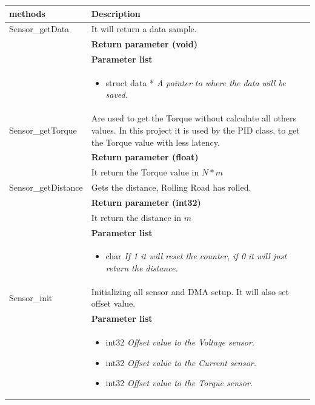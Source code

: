 \begin{table}[H]
	\centering
	\begin{tabular}{|p{5 cm}|p{10 cm}|}
		\hline
		\textbf{methods} & \textbf{Description} \\ \hline
		
		Sensor\_getData
		& It will return a data sample.
		\\ & \textbf{Return parameter (void)}
		\\ & \textbf{Parameter list}
		\\ & \begin{itemize}
			\item {\large struct data *}
			\subitem \textit{A pointer to where the data will be saved.}
		\end{itemize}
		\\ \hline
		
		Sensor\_getTorque
		& Are used to get the Torque without calculate all others values. In this project it is used by the PID class, to get the Torque value with less latency.
		\\ & \textbf{Return parameter (float)}
		\\ & It return the Torque value in $ N*m $ 
		\\ \hline
		
		Sensor\_getDistance
		& Gets the distance, Rolling Road has rolled. 
		\\ & \textbf{Return parameter (int32)}
		\\ & It return the distance in $ m $
		\\ & \textbf{Parameter list}
		\\ & \begin{itemize}
			\item {\large char}
			\subitem \textit{If 1 it will reset the counter, if 0 it will just return the distance.}
		\end{itemize}
		\\ \hline
			
			Sensor\_init
			& Initializing all sensor and DMA setup. It will also set offset value.   
			\\ & \textbf{Parameter list}
			\\ & \begin{itemize}
				\item {\large int32}
				\subitem \textit{Offset value to the Voltage sensor.}
				\item {\large int32}
				\subitem \textit{Offset value to the Current sensor.}
				\item {\large int32}
				\subitem \textit{Offset value to the Torque sensor.}
			\end{itemize}
			\\ \hline
			

\end{tabular}
\end{table}

